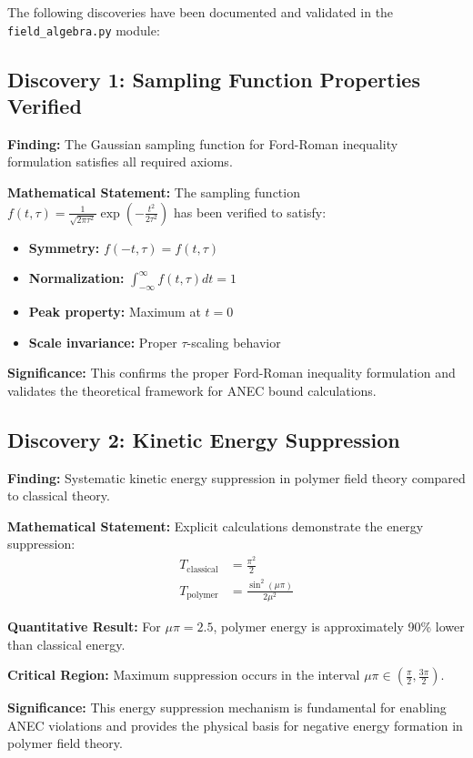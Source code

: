 \documentclass[11pt]{article}
\begin{document}
The following discoveries have been documented and validated in the \texttt{field\_algebra.py} module:

\subsection{Discovery 1: Sampling Function Properties Verified}

\textbf{Finding:} The Gaussian sampling function for Ford-Roman inequality formulation satisfies all required axioms.

\textbf{Mathematical Statement:} 
The sampling function $f(t,\tau) = \frac{1}{\sqrt{2\pi\tau^2}}\exp\left(-\frac{t^2}{2\tau^2}\right)$ has been verified to satisfy:
\begin{itemize}
    \item \textbf{Symmetry:} $f(-t,\tau) = f(t,\tau)$
    \item \textbf{Normalization:} $\int_{-\infty}^{\infty} f(t,\tau) dt = 1$
    \item \textbf{Peak property:} Maximum at $t = 0$
    \item \textbf{Scale invariance:} Proper $\tau$-scaling behavior
\end{itemize}

\textbf{Significance:} This confirms the proper Ford-Roman inequality formulation and validates the theoretical framework for ANEC bound calculations.

\subsection{Discovery 2: Kinetic Energy Suppression}

\textbf{Finding:} Systematic kinetic energy suppression in polymer field theory compared to classical theory.

\textbf{Mathematical Statement:}
Explicit calculations demonstrate the energy suppression:
\begin{align}
T_{\text{classical}} &= \frac{\pi^2}{2} \\
T_{\text{polymer}} &= \frac{\sin^2(\mu\pi)}{2\mu^2}
\end{align}

\textbf{Quantitative Result:} For $\mu\pi = 2.5$, polymer energy is approximately 90\% lower than classical energy.

\textbf{Critical Region:} Maximum suppression occurs in the interval $\mu\pi \in \left(\frac{\pi}{2}, \frac{3\pi}{2}\right)$.

\textbf{Significance:} This energy suppression mechanism is fundamental for enabling ANEC violations and provides the physical basis for negative energy formation in polymer field theory.
\end{document}
